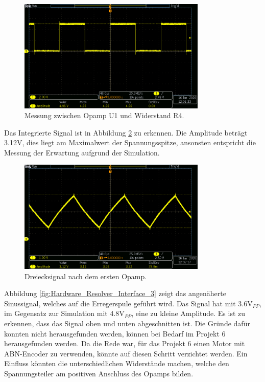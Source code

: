 \begin{figure}[h!]
	\centering
	\includegraphics[width=0.8\textwidth]{graphics/Resolver_Rechteck.png}
	\caption{Messung zwischen Opamp U1 und Widerstand R4.} 
	\label{fig:Hardware_Resolver_Interface_1}
\end{figure}

Das Integrierte Signal ist in Abbildung \ref{fig:Hardware_Resolver_Interface_2} zu erkennen. Die Amplitude beträgt 3.12V, dies liegt am Maximalwert der Spannungsspitze, ansonsten entspricht die Messung der Erwartung aufgrund der Simulation.

\begin{figure}[h!]
	\centering
	\includegraphics[width=0.8\textwidth]{graphics/Resolver_Dreieck.png}
	\caption{Dreiecksignal nach dem ersten Opamp.} 
	\label{fig:Hardware_Resolver_Interface_2}
\end{figure}
\newpage
Abbildung \ref{fig:Hardware_Resolver_Interface_3} zeigt das angenäherte Sinussignal, welches auf die Erregerspule geführt wird. Das Signal hat mit 3.6V$_{PP}$, im Gegensatz zur Simulation mit 4.8V$_{PP}$, eine zu kleine Amplitude. Es ist zu erkennen, dass das Signal oben und unten abgeschnitten ist. Die Gründe dafür konnten nicht herausgefunden werden, können bei Bedarf im Projekt 6 herausgefunden werden. Da die Rede war, für das Projekt 6 einen Motor mit ABN-Encoder zu verwenden, könnte auf diesen Schritt verzichtet werden. Ein Einfluss könnten die unterschiedlichen Widerstände machen, welche den Spannungsteiler am positiven Anschluss des Opamps bilden.


